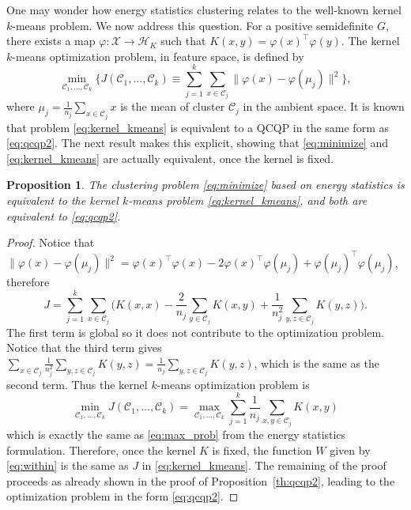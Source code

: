 \documentclass[aps,preprint,nofootinbib,floatfix]{revtex4-1}
\newtheorem{proposition}[theorem]{Proposition}
\newcommand\kk{K}
\newcommand\HH{\mathcal{H}}
\newcommand\C{{\mathcal{C}}}
\begin{document}
One may wonder how energy statistics clustering 
relates to the well-known kernel $k$-means problem.
We now address this question.
For a positive semidefinite $G$, there exists a map
$\varphi: \mathcal{X} \to \HH_\kk$ such that
$\kk(x,y) = \varphi(x)^\top \varphi(y)$. The kernel $k$-means optimization
problem,
in feature space,
is defined by
\begin{equation}
\label{eq:kernel_kmeans}
\min_{\C_1,\dotsc,\C_k}\bigg\{ 
J(\C_1,\dots,\C_k) \equiv  \sum_{j=1}^k
\sum_{x \in \C_j} \| \varphi(x) - \varphi(\mu_j) \|^2
\bigg\},
\end{equation}
where $\mu_j = \tfrac{1}{n_j} \sum_{x \in \C_j} x$ is the  mean of cluster
$\C_j$ in the ambient space.
It is known \cite{Dhillon} that problem \eqref{eq:kernel_kmeans} 
is equivalent to a QCQP in the same form as
\eqref{eq:qcqp2}. The next result makes this explicit, showing that
\eqref{eq:minimize} and \eqref{eq:kernel_kmeans} are actually equivalent,
once the kernel is fixed.

\begin{proposition}
\label{th:kernel_kmeans}
The clustering problem
\eqref{eq:minimize} based on energy statistics 
is equivalent to the kernel $k$-means problem
\eqref{eq:kernel_kmeans}, and both are equivalent to \eqref{eq:qcqp2}.
\end{proposition}
\begin{proof}
Notice that $\| \varphi(x) - \varphi(\mu_j) \|^2 = \varphi(x)^\top \varphi(x)
- 2 \varphi(x)^\top \varphi(\mu_j) + \varphi(\mu_j)^\top \varphi(\mu_j)$,
therefore
\begin{equation}
\label{eq:J}
J = \sum_{j=1}^k \sum_{x\in\C_j} \bigg(
\kk(x,x) - 
\dfrac{2}{n_j} \sum_{y\in \C_j} \kk(x,y) + \dfrac{1}{n_j^2}
\sum_{y,z \in \C_j} \kk(y,z) \bigg).
\end{equation}
The first term is global so it does not contribute to the optimization
problem. Notice that the third term gives
$\sum_{x\in\C_j} \tfrac{1}{n_j^2} \sum_{y,z\in\C_j} \kk(y,z) =
\tfrac{1}{n_j}\sum_{y,z\in\C_j} \kk(y,z)$, which is the same as
the second term. Thus the kernel $k$-means optimization problem is
\begin{equation}
\min_{\C_1,\dotsc,\C_k} J(\C_1,\dotsc,\C_k) = \max_{\C_1,\dotsc,\C_k}
\sum_{j=1}^k \dfrac{1}{n_j} \sum_{x,y \in\C_j} \kk(x,y)
\end{equation}
which is exactly the same as 
\eqref{eq:max_prob} from the energy statistics formulation. Therefore,
once the kernel $\kk$ is fixed, the function 
$W$ given by \eqref{eq:within} is the same
as $J$ in \eqref{eq:kernel_kmeans}.
The remaining of the proof proceeds as 
already shown in the proof of Proposition~\ref{th:qcqp2}, leading to
the optimization problem in the form \eqref{eq:qcqp2}.
\end{proof}
\end{document}
